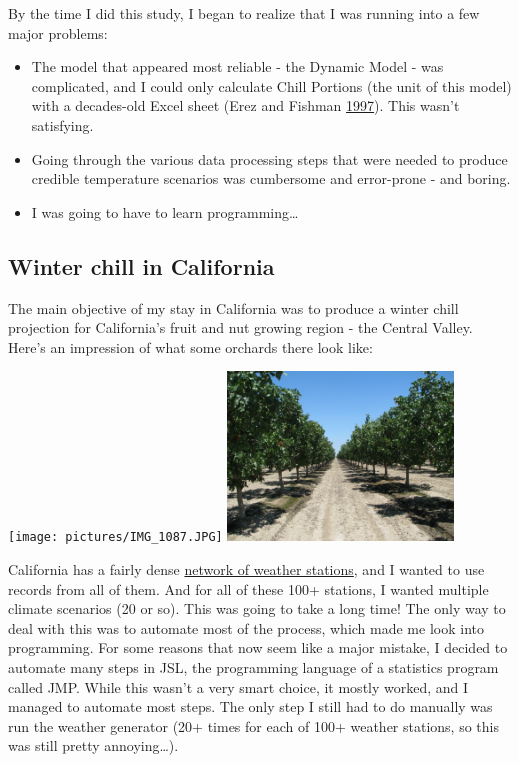 \documentclass[
]{book}
\begin{document}
By the time I did this study, I began to realize that I was running into a few major problems:

\begin{itemize}
\item
  The model that appeared most reliable - the Dynamic Model - was complicated, and I could only calculate Chill Portions (the unit of this model) with a decades-old Excel sheet (Erez and Fishman \protect\hyperlink{ref-ExcelDM}{1997}). This wasn't satisfying.
\item
  Going through the various data processing steps that were needed to produce credible temperature scenarios was cumbersome and error-prone - and boring.
\item
  I was going to have to learn programming\ldots{}
\end{itemize}

\hypertarget{winter-chill-in-california}{%
\subsection{Winter chill in California}\label{winter-chill-in-california}}

The main objective of my stay in California was to produce a winter chill projection for California's fruit and nut growing region - the Central Valley. Here's an impression of what some orchards there look like:

\texttt{[image: pictures/IMG\_1087.JPG]} \includegraphics[width=0.45\textwidth,height=\textheight]{pictures/IMG_2969.JPG}

California has a fairly dense \href{https://cimis.water.ca.gov/}{network of weather stations}, and I wanted to use records from all of them. And for all of these 100+ stations, I wanted multiple climate scenarios (20 or so). This was going to take a long time! The only way to deal with this was to automate most of the process, which made me look into programming. For some reasons that now seem like a major mistake, I decided to automate many steps in JSL, the programming language of a statistics program called JMP. While this wasn't a very smart choice, it mostly worked, and I managed to automate most steps. The only step I still had to do manually was run the weather generator (20+ times for each of 100+ weather stations, so this was still pretty annoying\ldots).
\end{document}
